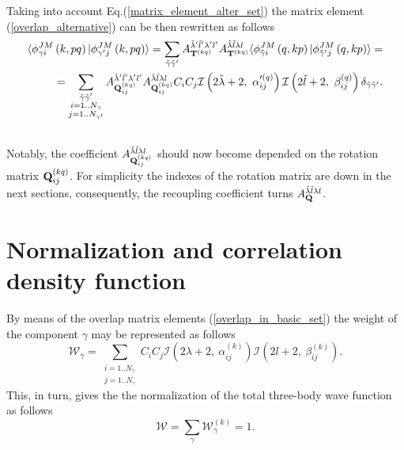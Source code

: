 \documentclass[
12pt, %
oneside, %
english, %
doublespacing, %
doublespacing, %
toctotoc, %
parskip, %
headsepline, %
]{MastersDoctoralThesis} %
\begin{document}
Taking into account Eq.(\ref{matrix_element_alter_set}) the matrix element (\ref{overlap_alternative}) can be then rewritten  as follows
\begin{align}
\langle \phi^{ J M}_{\gamma i}\left(k,pq \right) \vert 
\phi^{ J M}_{\gamma^{\prime}j}\left(k,pq \right) \rangle
= \label{overlap_to_q}
\sum_{\tilde{\gamma} \tilde{\gamma}'}
A^{\tilde{\lambda}' \tilde{l}' \lambda' l'}_{{\bf T}^{(kq)} }
A^{\tilde{\lambda} \tilde{l} \lambda l}_{{\bf T}^{(kq)} }
\langle \phi^{ J M}_{\tilde{\gamma} i}\left(q,kp \right) \vert 
\phi^{ J M}_{\tilde{\gamma}^{\prime}j}\left(q,kp \right) \rangle= 
 \nonumber  \\
=
\sum_{\substack{\tilde{\gamma} \tilde{\gamma}'\\i=1..N_\gamma \\j=1..N_{\gamma'}}}
A^{\tilde{\lambda}' \tilde{l}' \lambda' l'}_{{\bf Q}^{(kq)}_{ij} }
A^{\tilde{\lambda} \tilde{l} \lambda l}_{{\bf Q}^{(kq)}_{ij} }
 C_i C_j
 \mathcal{I} \left( 2 \tilde{\lambda}+2,~
\alpha'^{(q)}_{ij}
  \right)
\mathcal{I} \left( 2 \tilde{l}+2, ~
\beta_{ij}^{(q)} \right)
  \delta_{\tilde{\gamma}\tilde{\gamma}^{\prime}}.  \nonumber \\
  {}
\end{align}
Notably, the coefficient $A^{\tilde{\lambda} \tilde{l} \lambda l}_{ \tiny {\bf Q}^{(kq)}_{ij} }$ should now become depended on the rotation matrix ${\bf Q}^{(kq)}_{ij}$. For simplicity the indexes of the rotation matrix are down in the next sections, consequently, the recoupling coefficient turns $A^{\tilde{\lambda} \tilde{l} \lambda l}_{  {\bf Q} }$.


\section{Normalization and correlation density function}
By means of the overlap matrix elements (\ref{overlap_in_basic_set})  the weight of the component $\gamma$ may be represented as follows
\begin{equation}
\mathcal{W}_{\gamma} =  
\sum_{\substack{i=1..N_\gamma \\j=1..N_{\gamma}}} 
C_i C_j 
 \mathcal{I} \left( 2\lambda+2,~\alpha_{ij}^{(k)} \right)
 \mathcal{I} \left( 2l+2,~\beta_{ij}^{(k)} \right).
 \label{wf_normalizations}
\end{equation}
This, in turn, gives the the normalization of the total three-body wave function as follows
\begin{equation}
\mathcal{W}  = \sum_{\gamma} \mathcal{W}^{(k)}_{\gamma}=1.    
\end{equation}
\end{document}
